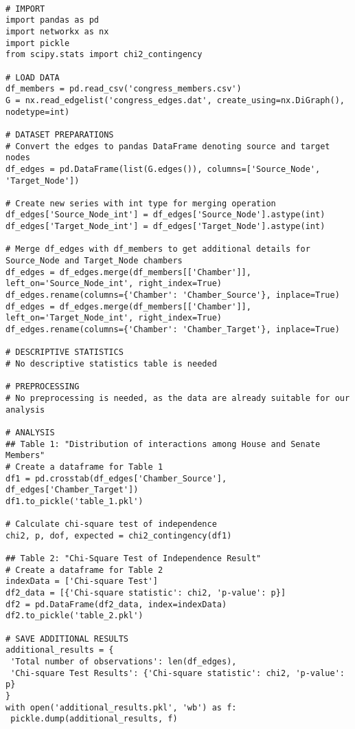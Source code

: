 \documentclass[11pt]{article}
\begin{document}
\begin{verbatim}

# IMPORT
import pandas as pd
import networkx as nx
import pickle
from scipy.stats import chi2_contingency

# LOAD DATA
df_members = pd.read_csv('congress_members.csv')
G = nx.read_edgelist('congress_edges.dat', create_using=nx.DiGraph(), nodetype=int)

# DATASET PREPARATIONS
# Convert the edges to pandas DataFrame denoting source and target nodes
df_edges = pd.DataFrame(list(G.edges()), columns=['Source_Node', 'Target_Node'])

# Create new series with int type for merging operation
df_edges['Source_Node_int'] = df_edges['Source_Node'].astype(int)
df_edges['Target_Node_int'] = df_edges['Target_Node'].astype(int)

# Merge df_edges with df_members to get additional details for Source_Node and Target_Node chambers
df_edges = df_edges.merge(df_members[['Chamber']], left_on='Source_Node_int', right_index=True)
df_edges.rename(columns={'Chamber': 'Chamber_Source'}, inplace=True)
df_edges = df_edges.merge(df_members[['Chamber']], left_on='Target_Node_int', right_index=True)
df_edges.rename(columns={'Chamber': 'Chamber_Target'}, inplace=True)

# DESCRIPTIVE STATISTICS
# No descriptive statistics table is needed

# PREPROCESSING
# No preprocessing is needed, as the data are already suitable for our analysis

# ANALYSIS
## Table 1: "Distribution of interactions among House and Senate Members"
# Create a dataframe for Table 1
df1 = pd.crosstab(df_edges['Chamber_Source'], df_edges['Chamber_Target'])
df1.to_pickle('table_1.pkl')

# Calculate chi-square test of independence
chi2, p, dof, expected = chi2_contingency(df1)

## Table 2: "Chi-Square Test of Independence Result"
# Create a dataframe for Table 2
indexData = ['Chi-square Test']
df2_data = [{'Chi-square statistic': chi2, 'p-value': p}]
df2 = pd.DataFrame(df2_data, index=indexData)
df2.to_pickle('table_2.pkl')

# SAVE ADDITIONAL RESULTS
additional_results = {
 'Total number of observations': len(df_edges),
 'Chi-square Test Results': {'Chi-square statistic': chi2, 'p-value': p}
}
with open('additional_results.pkl', 'wb') as f:
 pickle.dump(additional_results, f)

\end{verbatim}
\end{document}
